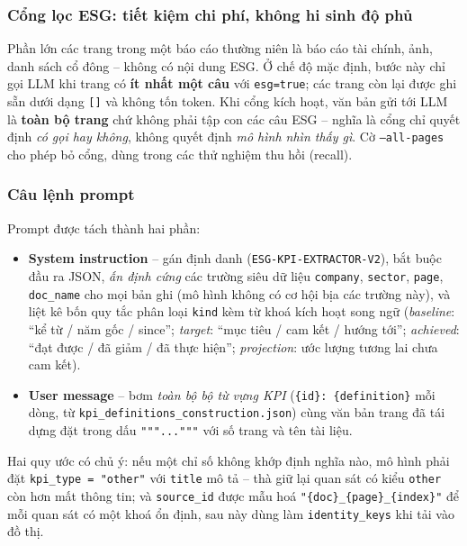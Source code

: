 \documentclass{article}
\begin{document}
\subsubsection{Cổng lọc ESG: tiết kiệm chi phí, không hi sinh độ phủ}

Phần lớn các trang trong một báo cáo thường niên là báo cáo tài chính, ảnh, danh
sách cổ đông -- không có nội dung ESG. Ở chế độ mặc định, bước này chỉ gọi LLM
khi trang có \textbf{ít nhất một câu} với \texttt{esg=true}; các trang còn lại
được ghi sẵn dưới dạng \texttt{[]} và không tốn token. Khi cổng kích hoạt, văn
bản gửi tới LLM là \textbf{toàn bộ trang} chứ không phải tập con các câu ESG --
nghĩa là cổng chỉ quyết định \textit{có gọi hay không}, không quyết định
\textit{mô hình nhìn thấy gì}. Cờ \texttt{--all-pages} cho phép bỏ cổng, dùng
trong các thử nghiệm thu hồi (recall).

\subsubsection{Câu lệnh prompt}

Prompt được tách thành hai phần:

\begin{itemize}
  \item \textbf{System instruction} -- gán định danh (\texttt{ESG-KPI-EXTRACTOR-V2}),
        bắt buộc đầu ra JSON, \textit{ấn định cứng} các trường siêu dữ liệu
        \texttt{company}, \texttt{sector}, \texttt{page}, \texttt{doc\_name} cho
        mọi bản ghi (mô hình không có cơ hội bịa các trường này), và liệt kê
        bốn quy tắc phân loại \texttt{kind} kèm từ khoá kích hoạt song ngữ
        (\textit{baseline}: ``kể từ / năm gốc / since''; \textit{target}: ``mục
        tiêu / cam kết / hướng tới''; \textit{achieved}: ``đạt được / đã giảm /
        đã thực hiện''; \textit{projection}: ước lượng tương lai chưa cam kết).
  \item \textbf{User message} -- bơm \textit{toàn bộ bộ từ vựng KPI}
        (\texttt{\{id\}: \{definition\}} mỗi dòng, từ
        \texttt{kpi\_definitions\_construction.json}) cùng văn bản trang đã tái
        dựng đặt trong dấu \texttt{"""..."""} với số trang và tên tài liệu.
\end{itemize}

Hai quy ước có chủ ý: nếu một chỉ số không khớp định nghĩa nào, mô hình phải đặt
\texttt{kpi\_type = "other"} với \texttt{title} mô tả -- thà giữ lại quan sát có
kiểu \texttt{other} còn hơn mất thông tin; và \texttt{source\_id} được mẫu hoá
\texttt{"\{doc\}\_\{page\}\_\{index\}"} để mỗi quan sát có một khoá ổn định, sau
này dùng làm \texttt{identity\_keys} khi tải vào đồ thị.
\end{document}
